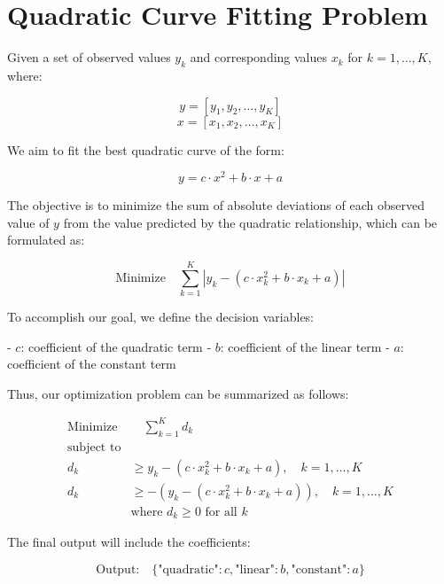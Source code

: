 \documentclass{article}
\begin{document}
\section*{Quadratic Curve Fitting Problem}

Given a set of observed values \( y_k \) and corresponding values \( x_k \) for \( k = 1, \ldots, K \), where:

\[
y = [y_1, y_2, \ldots, y_K]
\]
\[
x = [x_1, x_2, \ldots, x_K]
\]

We aim to fit the best quadratic curve of the form:

\[
y = c \cdot x^2 + b \cdot x + a
\]

The objective is to minimize the sum of absolute deviations of each observed value of \( y \) from the value predicted by the quadratic relationship, which can be formulated as:

\[
\text{Minimize} \quad \sum_{k=1}^{K} |y_k - (c \cdot x_k^2 + b \cdot x_k + a)|
\]

To accomplish our goal, we define the decision variables:

- \( c \): coefficient of the quadratic term
- \( b \): coefficient of the linear term
- \( a \): coefficient of the constant term

Thus, our optimization problem can be summarized as follows:

\[
\begin{align*}
\text{Minimize} & \quad \sum_{k=1}^{K} d_k \\
\text{subject to} & \\
d_k & \geq y_k - (c \cdot x_k^2 + b \cdot x_k + a), \quad k = 1, \ldots, K \\
d_k & \geq -(y_k - (c \cdot x_k^2 + b \cdot x_k + a)), \quad k = 1, \ldots, K \\
& \text{where } d_k \geq 0 \text{ for all } k
\end{align*}
\]

The final output will include the coefficients:

\[
\text{Output:} \quad \{ \text{"quadratic"}: c, \text{"linear"}: b, \text{"constant"}: a \}
\]
\end{document}
